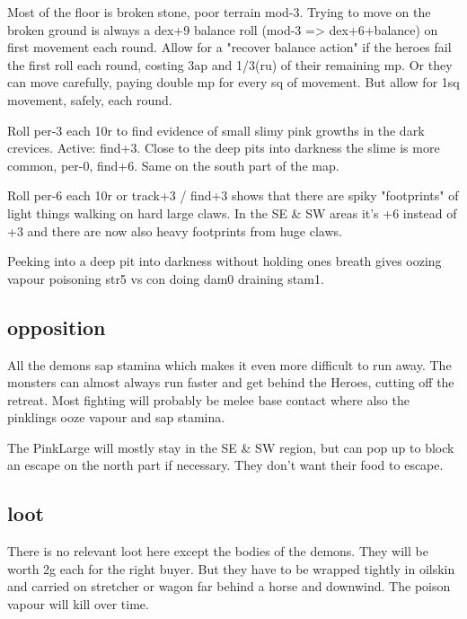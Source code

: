 Most of the floor is broken stone, poor terrain mod-3.
Trying to move on the broken ground is always a dex+9 balance roll (mod-3 => dex+6+balance) on first movement each round. Allow for a "recover balance action" if the heroes fail the first roll each round, costing 3ap and 1/3(ru) of their remaining mp.
Or they can move carefully, paying double mp for every sq of movement. But allow for 1sq movement, safely, each round.

Roll per-3 each 10r to find evidence of small slimy pink growths in the dark crevices. Active: find+3. Close to the deep pits into darkness the slime is more common, per-0, find+6. Same on the south part of the map.

Roll per-6 each 10r or track+3 / find+3 shows that there are spiky "footprints" of light things walking on hard large claws. In the SE \& SW areas it's +6 instead of +3 and there are now also heavy footprints from huge claws.

Peeking into a deep pit into darkness without holding ones breath gives oozing vapour poisoning str5 vs con doing dam0 draining stam1.


\subsection*{opposition}
All the demons sap stamina which makes it even more difficult to run away. The monsters can almost always run faster and get behind the Heroes, cutting off the retreat. Most fighting will probably be melee base contact where also the pinklings ooze vapour and sap stamina.

The PinkLarge will mostly stay in the SE \& SW region, but can pop up to block an escape on the north part if necessary. They don't want their food to escape.


\subsection*{loot}
There is no relevant loot here except the bodies of the demons. They will be worth 2g each for the right buyer. But they have to be wrapped tightly in oilskin and carried on stretcher or wagon far behind a horse and downwind. The poison vapour will kill over time.







